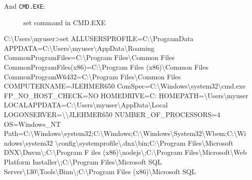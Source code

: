 \documentclass[10pt,american,]{book}
\newenvironment{Shaded}{\begin{snugshade}}{\end{snugshade}}
\newcommand{\KeywordTok}[1]{\textcolor[rgb]{0.13,0.29,0.53}{\textbf{{#1}}}}
\newcommand{\DataTypeTok}[1]{\textcolor[rgb]{0.13,0.29,0.53}{{#1}}}
\newcommand{\OtherTok}[1]{\textcolor[rgb]{0.56,0.35,0.01}{{#1}}}
\newcommand{\NormalTok}[1]{{#1}}
\numberwithin{figure}{chapter}
\DeclareRobustCommand{\drcap}[1]{\begin{figure}[H]\caption{#1}\end{figure}}
\renewcommand{\KeywordTok}[1]{{#1}}
\renewcommand{\DataTypeTok}[1]{{#1}}
\renewcommand{\OtherTok}[1]{{#1}}
\renewcommand{\NormalTok}[1]{{#1}}
\begin{document}
And \texttt{CMD.EXE}:

\drcap{set command in CMD.EXE}

\begin{Shaded}
\begin{Highlighting}[]
\KeywordTok{C}\NormalTok{:\textbackslash{}Users\textbackslash{}myuser}\KeywordTok{>}\NormalTok{set}
\OtherTok{ALLUSERSPROFILE=}\NormalTok{C:\textbackslash{}}\KeywordTok{ProgramData}
\OtherTok{APPDATA=}\NormalTok{C:\textbackslash{}}\KeywordTok{Users}\NormalTok{\textbackslash{}myuser\textbackslash{}AppData\textbackslash{}Roaming}
\OtherTok{CommonProgramFiles=}\NormalTok{C:\textbackslash{}}\KeywordTok{Program} \NormalTok{Files\textbackslash{}Common Files}
\KeywordTok{CommonProgramFiles}\NormalTok{(x86)=}\KeywordTok{C}\NormalTok{:\textbackslash{}Program Files (x86)\textbackslash{}}\KeywordTok{Common} \NormalTok{Files}
\OtherTok{CommonProgramW6432=}\NormalTok{C:\textbackslash{}}\KeywordTok{Program} \NormalTok{Files\textbackslash{}Common Files}
\OtherTok{COMPUTERNAME=}\NormalTok{JLEHMER650}
\OtherTok{ComSpec=}\NormalTok{C:\textbackslash{}}\KeywordTok{Windows}\NormalTok{\textbackslash{}system32\textbackslash{}cmd.exe}
\OtherTok{FP_NO_HOST_CHECK=}\NormalTok{NO}
\OtherTok{HOMEDRIVE=}\NormalTok{C:}
\OtherTok{HOMEPATH=}\NormalTok{\textbackslash{}}\KeywordTok{Users}\NormalTok{\textbackslash{}myuser}
\OtherTok{LOCALAPPDATA=}\NormalTok{C:\textbackslash{}}\KeywordTok{Users}\NormalTok{\textbackslash{}myuser\textbackslash{}AppData\textbackslash{}Local}
\OtherTok{LOGONSERVER=}\DataTypeTok{\textbackslash{}\textbackslash{}}\NormalTok{JLEHMER650}
\OtherTok{NUMBER_OF_PROCESSORS=}\NormalTok{4}
\OtherTok{OS=}\NormalTok{Windows_NT}
\OtherTok{Path=}\NormalTok{C:\textbackslash{}}\KeywordTok{Windows}\NormalTok{\textbackslash{}system32}\KeywordTok{;C}\NormalTok{:\textbackslash{}Windows}\KeywordTok{;C}\NormalTok{:\textbackslash{}Windows\textbackslash{}System32\textbackslash{}Wbem}\KeywordTok{;C}\NormalTok{:\textbackslash{}Windows\textbackslash{}system32}
\NormalTok{\textbackslash{}}\KeywordTok{config}\NormalTok{\textbackslash{}systemprofile\textbackslash{}.dnx\textbackslash{}bin}\KeywordTok{;C}\NormalTok{:\textbackslash{}Program Files\textbackslash{}Microsoft DNX\textbackslash{}Dnvm}\DataTypeTok{\textbackslash{};}\NormalTok{C:\textbackslash{}Program F}
\KeywordTok{iles} \NormalTok{(x86)\textbackslash{}}\KeywordTok{nodejs}\DataTypeTok{\textbackslash{};}\NormalTok{C:\textbackslash{}Program Files\textbackslash{}Microsoft\textbackslash{}Web Platform Installer}\DataTypeTok{\textbackslash{};}\NormalTok{C:\textbackslash{}Program}
 \KeywordTok{Files}\NormalTok{\textbackslash{}Microsoft SQL Server\textbackslash{}130\textbackslash{}Tools\textbackslash{}Binn}\DataTypeTok{\textbackslash{};}\NormalTok{C:\textbackslash{}Program Files (x86)\textbackslash{}}\KeywordTok{Microsoft} \NormalTok{SQL}

\end{Highlighting}
\end{Shaded}
\end{document}
